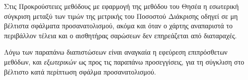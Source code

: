 \begin{remark}
  \label{remark:02_04_02:04}
  Στις Προκρούστειες μεθόδους με εφαρμογή της μεθόδου του Θησέα η εσωτερική
  σύγκριση μεταξύ των τιμών της μετρικής του Ποσοστού Διάκρισης οδηγεί σε μη
  βέλτιστα σφάλματα προσανατολισμού, ακόμα και όταν ο χάρτης αναπαριστά το
  περιβάλλον τέλεια και ο αισθητήρας σαρώσεων δεν επηρεάζεται από διαταραχές.
\end{remark}

Λόγω των παραπάνω διαπιστώσεων είναι αναγκαία η εφεύρεση επιπρόσθετων μεθόδων,
και \textit{εξωτερικών} ως προς τις παραπάνω προσεγγίσεις, για τη σύγκλιση στο
βέλτιστο κατά περίπτωση σφάλμα προσανατολισμού.
